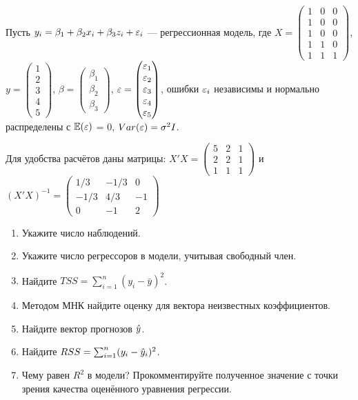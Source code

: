 \begin{problem}
Пусть $y_i = \beta_1 + \beta_2 x_{i} + \beta_3 z_i + \varepsilon_i$ — регрессионная модель, 
где $X = \begin{pmatrix} 1 & 0 & 0 \\ 1 & 0 & 0 \\ 1 & 0 & 0 \\ 1 & 1 & 0 \\ 1 & 1 & 1 \end{pmatrix}$, 
$y = \begin{pmatrix} 1 \\ 2 \\ 3 \\ 4 \\ 5 \end{pmatrix}$, 
$\beta = \begin{pmatrix} \beta_1 \\ \beta_2 \\ \beta_3 \end{pmatrix}$, 
$\varepsilon = \begin{pmatrix} \varepsilon_1 \\ \varepsilon_2 \\ \varepsilon_3 \\ \varepsilon_4 \\ \varepsilon_5  \end{pmatrix}$, ошибки 
$\varepsilon_i$ независимы и нормально распределены с $\operatorname{\mathbb E}(\varepsilon)$ = 0, $Var(\varepsilon) = \sigma^2 I$. 

Для удобства расчётов даны матрицы: $X'X = \begin{pmatrix} 5 & 2 & 1 \\ 2 & 2 & 1\\ 1 & 1 & 1 \end{pmatrix}$ и 
$(X'X)^{-1}= \begin{pmatrix} 1/3 & -1/3 & 0 \\ -1/3 & 4/3 & -1 \\ 0 & -1 & 2 \end{pmatrix}$


\begin{enumerate}
\item Укажите число наблюдений.
\item Укажите число регрессоров в модели, учитывая свободный член.
\item Найдите $TSS = \sum_{i=1}^n (y_i - \bar y)^2$.
\item Методом МНК найдите оценку для вектора неизвестных коэффициентов.
\item Найдите вектор прогнозов $\hat{y}$.
\item Найдите $RSS = \sum_{i=1}^n (y_i - \hat{y}_i)^2$.
\item Чему равен $R^2$ в модели? Прокомментируйте полученное значение с точки зрения качества оценённого уравнения регрессии.\end{enumerate}
\begin{sol}


\end{sol}
\end{problem}

